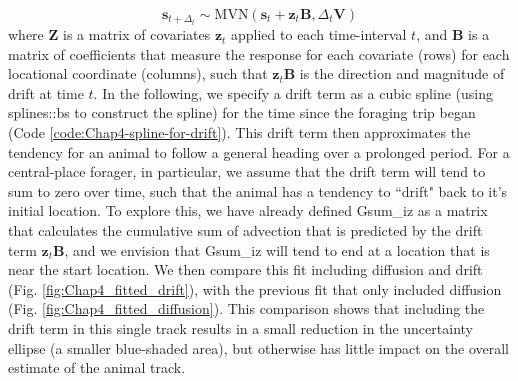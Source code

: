 \begin{equation}
    \mathbf{s}_{t+\Delta_t} \sim \mathrm{MVN}( \mathbf{s}_t + \mathbf{z}_t \mathbf{B}, \Delta_t \mathbf{V})    
\end{equation}
where \( \mathbf{Z} \) is a matrix of covariates \( \mathbf{z}_t \) applied to each time-interval \(t\), and \( \mathbf{B} \) is a matrix of coefficients that measure the response for each covariate (rows) for each locational coordinate (columns), such that \(\mathbf{z}_t \mathbf{B}\) is the direction and magnitude of drift at time \(t\).  In the following, we specify a drift term as a cubic spline (using \colorbox{backcolour}{splines::bs} to construct the spline) for the time since the foraging trip began (Code \ref{code:Chap4-spline-for-drift}).  This drift term then approximates the tendency for an animal to follow a general heading over a prolonged period.  For a central-place forager, in particular, we assume that the drift term will tend to sum to zero over time, such that the animal has a tendency to ``drift" back to it's initial location. To explore this, we have already defined \colorbox{backblue}{Gsum\_iz} as a matrix that calculates the cumulative sum of  advection that is predicted by the drift term \( \mathbf{z}_t \mathbf{B} \), and we envision that \colorbox{backblue}{Gsum\_iz} will tend to end at a location that is near the start location.  We then compare this fit including diffusion and drift (Fig. \ref{fig:Chap4_fitted_drift}), with the previous fit that only included diffusion (Fig. \ref{fig:Chap4_fitted_diffusion}).  This comparison shows that including the drift term in this single track results in a small reduction in the uncertainty ellipse (a smaller blue-shaded area), but otherwise has little impact on the overall estimate of the animal track. 

\lstset{style=Rcode}

 

